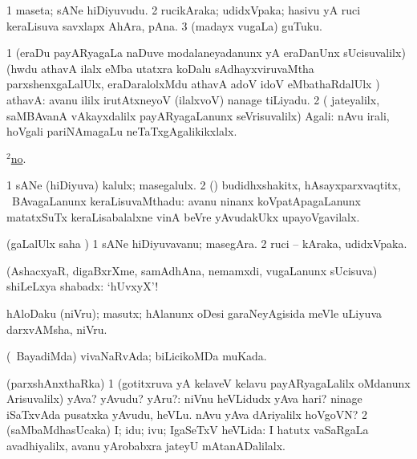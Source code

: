 \bentry
{} 
\gl{\nA}
\expl{}
\bmng
\bnum
\num{1} maseta; sANe hiDiyuvudu. 
\num{2} rucikAraka; udidxVpaka; hasivu yA ruci keraLisuva savxlapx AhAra, pAna. 
\num{3} (madayx \mo vugaLa) guTuku. 
\enum
\emng
\eentry

\bentry
{} 
\gl{\saMavayx}
\expl{}
\bmng
\bnum
\num{1} (eraDu payARyagaLa naDuve modalaneyadanunx yA eraDanUnx sUcisuvalilx)(hwdu athavA ilalx eMba utatxra koDalu sAdhayxviruvaMtha parxshenxgaLalUlx, eraDaralolxMdu athavA adoV idoV eMbathaRdalUlx \parx) athavA:  avanu ililx irutAtxneyoV (ilalxvoV) nanage tiLiyadu. 
\num{2} ( jateyalilx, saMBAvanA vAkayxdalilx payARyagaLanunx seVrisuvalilx) Agali:  nAvu irali, hoVgali pariNAmagaLu neTaTxgAgalikikxlalx. 
\enum
\emng

\noindent
\gl{\pagu}
\expl{}
\bmng
{} \hyperref{kandict_n.pdf}{N}{no(2) pagu(2)}{$^2$no}. 
\emng
\eentry

\bentry
{}
\gl{\nA}
\expl{}
\bmng
\bnum
\num{1} sANe (hiDiyuva) kalulx; masegalulx. 
\num{2} (\rUpa) budidhxshakitx, hAsayxparxvaqtitx, \mo\ BAvagaLanunx keraLisuvaMthadu:  avanu ninanx koVpatApagaLanunx matatxSuTx keraLisabalalxne vinA beVre yAvudakUkx upayoVgavilalx. 
\enum
\emng
\eentry

\bentry
{} 
\gl{\nA}
\expl{}
\bmng
(\saMpa gaLalUlx saha \parx) 
\bnum
\num{1} sANe hiDiyuvavanu; masegAra. 
\num{2} ruci -- kAraka, udidxVpaka. 
\enum
\emng
\eentry

\bentry
{} 
\gl{\BAavayx}
\expl{}
\bmng
(AshacxyaR, digaBxrXme, samAdhAna, nemamxdi, \mo vugaLanunx sUcisuva) shiLeLxya shabadx: `hUvxyX'! 
\emng
\eentry

\bentry
{} 
\gl{\nA}
\expl{}
\bmng
hAloDaku (niVru); masutx; hAlanunx oDesi garaNeyAgisida meVle uLiyuva darxvAMsha, niVru. 
\emng
\eentry

\bentry
{} 
\gl{\gu}
\expl{}
\bmng
(\kanmu\ BayadiMda) vivaNaRvAda; biLicikoMDa muKada. 
\emng
\eentry

\bentry
{} 
\gl{\gu}
\expl{}
\bmng
(parxshAnxthaRka) 
\bnum
\num{1} (gotitxruva yA kelaveV kelavu payARyagaLalilx oMdanunx Arisuvalilx) yAva? yAvudu? yAru?:  niVnu heVLidudx yAva hari?  ninage iSaTxvAda pusatxka yAvudu, heVLu.  nAvu yAva dAriyalilx hoVgoVN? 
\num{2} (saMbaMdhasUcaka) I; idu; ivu; IgaSeTxV heVLida:  I hatutx vaSaRgaLa avadhiyalilx, avanu yArobabxra jateyU mAtanADalilalx. 
\enum
\emng
\eentry

